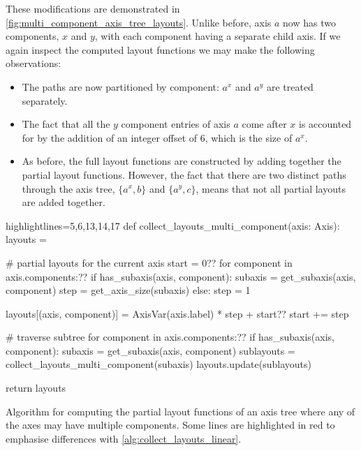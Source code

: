 \documentclass[thesis]{subfiles}
\begin{document}
These modifications are demonstrated in \cref{fig:multi_component_axis_tree_layouts}.
Unlike before, axis $a$ now has two components, $x$ and $y$, with each component having a separate child axis.
If we again inspect the computed layout functions we may make the following observations:
\begin{itemize}
  \item
    The paths are now partitioned by component: $a^x$ and $a^y$ are treated separately.
  \item
    The fact that all the $y$ component entries of axis $a$ come after $x$ is accounted for by the addition of an integer offset of 6, which is the size of $a^x$.
  \item
    As before, the full layout functions are constructed by adding together the partial layout functions.
    However, the fact that there are two distinct paths through the axis tree, $\{a^x, b\}$ and $\{a^y, c\}$, means that not all partial layouts are added together.
\end{itemize}

\begin{algorithm}
  \begin{flushright}
    \begin{minipage}{.96\textwidth}
      \begin{pyalg2*}{highlightlines={5,6,13,14,17}}
        def collect_layouts_multi_component(axis: Axis):
          layouts = {}

          # partial layouts for the current axis
          start = 0?\label{code:multi_component_start_var}?
          for component in axis.components:?\label{code:mc_loop1}?
            if has_subaxis(axis, component):
              subaxis = get_subaxis(axis, component)
              step = get_axis_size(subaxis)
            else:
              step = 1

            layouts[(axis, component)] = AxisVar(axis.label) * step + start?\label{code:mc_layout_store}?
            start += step

          # traverse subtree
          for component in axis.components:?\label{code:mc_loop2}?
            if has_subaxis(axis, component): 
              subaxis = get_subaxis(axis, component)
              sublayouts = collect_layouts_multi_component(subaxis)
              layouts.update(sublayouts)

          return layouts
      \end{pyalg2*}
    \end{minipage}
  \end{flushright}

  \caption{
    Algorithm for computing the partial layout functions of an axis tree where any of the axes may have multiple components.
    Some lines are highlighted in red to emphasise differences with \cref{alg:collect_layouts_linear}.
  }
  \label{alg:collect_layouts_multi_component}
\end{algorithm}
\end{document}
